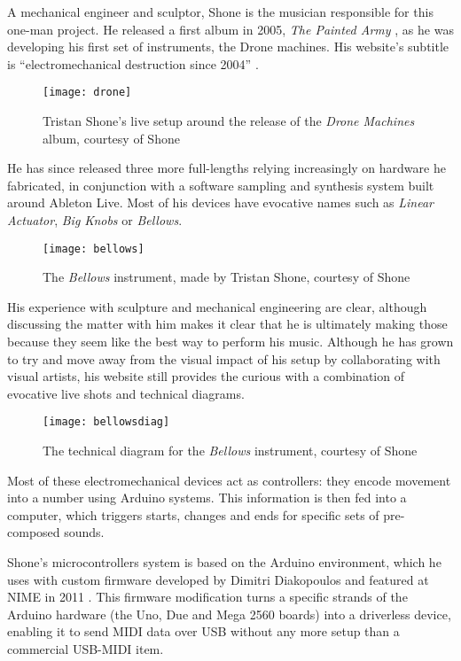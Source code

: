 A mechanical engineer and sculptor, Shone is the musician responsible for this one-man project. He released a first album in 2005, \emph{The Painted Army} \citep{shone,2005}, as he was developing his first set of instruments, the Drone machines. His website's subtitle is ``electromechanical destruction since 2004'' \citep{shone2004}.

	\begin{figure}[H]
	  \centering
	    \texttt{[image: drone]}
	     \caption{Tristan Shone's live setup around the release of the \emph{Drone Machines} album, courtesy of Shone}
	\end{figure}
	
He has since released three more full-lengths relying increasingly on hardware he fabricated, in conjunction with a software sampling and synthesis system built around Ableton Live. Most of his devices have evocative names such as \emph{Linear Actuator}, \emph{Big Knobs} or \emph{Bellows}. 

	\begin{figure}[H]
	 	  \centering
	    \texttt{[image: bellows]}
	    \caption{The \emph{Bellows} instrument, made by Tristan Shone, courtesy of Shone}
	\end{figure}

His experience with sculpture and mechanical engineering are clear, although discussing the matter with him makes it clear that he is ultimately making those because they seem like the best way to perform his music. Although he has grown to try and move away from the visual impact of his setup by collaborating with visual artists, his website still provides the curious with a combination of evocative live shots and technical diagrams. 

	\begin{figure}[H]
	  	  \centering
	    \texttt{[image: bellowsdiag]}
	    \caption{The technical diagram for the \emph{Bellows} instrument, courtesy of Shone}

	\end{figure}
	
Most of these electromechanical devices act as controllers: they encode movement into a number using Arduino systems. This information is then fed into a computer, which triggers starts, changes and ends for specific sets of pre-composed sounds. 

Shone's microcontrollers system is based on the Arduino environment, which he uses with custom firmware developed by Dimitri Diakopoulos and featured at NIME in 2011 \citep{diakopoulos2011,diakopoulos2015} . This firmware modification turns a specific strands of the Arduino hardware (the Uno, Due and Mega 2560 boards) into a driverless device, enabling it to send MIDI data over USB without any more setup than a commercial USB-MIDI item. 

